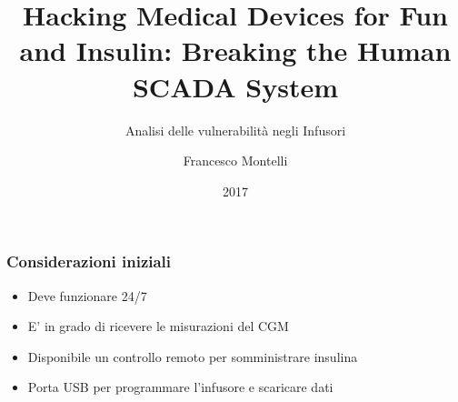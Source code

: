\documentclass{beamer}
\title{Hacking Medical Devices for Fun and Insulin: Breaking the Human 
SCADA System}
\subtitle{Analisi delle vulnerabilità negli Infusori}
\author{Francesco Montelli}
\institute{CeSeNa}
\date{2017}
\begin{document}
 
\frame{\titlepage}

\begin{frame}
\frametitle{Considerazioni iniziali}
	\begin{itemize}
		\item Deve funzionare 24/7
		\item E' in grado di ricevere le misurazioni del CGM
		\item Disponibile un controllo remoto per somministrare insulina
		\item Porta USB per programmare l'infusore e scaricare dati
	\end{itemize}
\end{frame}
\end{document}

